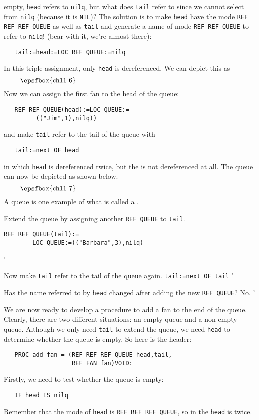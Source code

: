 empty, \verb|head| refers to \verb|nilq|, but what does \verb|tail|
refer to since we cannot select from \verb|nilq| (because it is
\verb|NIL|)? The solution is to make \verb|head| have the mode
\verb|REF REF REF QUEUE| as well as \verb|tail| and generate a name
of mode \verb|REF REF QUEUE| to refer to \verb|nilq|! (bear with it,
we're almost there):
\begin{verbatim}
   tail:=head:=LOC REF QUEUE:=nilq
\end{verbatim}
\noindent
In this triple assignment, only \verb|head| is dereferenced. We can
depict this as
$$\vbox{\epsfbox{ch11-6}}$$
Now we can assign the first fan to the head of the queue:
\begin{verbatim}
   REF REF QUEUE(head):=LOC QUEUE:=
         (("Jim",1),nilq))
\end{verbatim}
\noindent
and make \verb|tail| refer to the tail of the queue with
\begin{verbatim}
   tail:=next OF head
\end{verbatim}
\noindent
in which \verb|head| is dereferenced twice, but the
 is not dereferenced at all. The queue can
now be depicted as shown below.
$$\vbox{\epsfbox{ch11-7}}$$
A queue is one example of what is called a
.

\begin{exercise}
\item Extend the queue by assigning another \verb|REF QUEUE| to
\verb|tail|. \ans \begin{verbatim}
REF REF QUEUE(tail):=
        LOC QUEUE:=(("Barbara",3),nilq)
\end{verbatim}
'
\item Now make \verb|tail| refer to the tail of the queue again.
\ans \verb|tail:=next OF tail|
'
\item Has the name referred to by \verb|head| changed after adding the
new \verb|REF QUEUE|? \ans No.
'
\end{exercise}

We are now ready to develop a procedure to add a fan to the end of the
queue. Clearly, there are two different situations: an empty queue and
a non-empty queue. Although we only need \verb|tail| to extend the
queue, we need \verb|head| to determine whether the queue is empty. So
here is the header:
\begin{verbatim}
   PROC add fan = (REF REF REF QUEUE head,tail,
                   REF FAN fan)VOID:
\end{verbatim}
\noindent
Firstly, we need to test whether the queue is empty:
\begin{verbatim}
   IF head IS nilq
\end{verbatim}
\noindent
Remember that the mode of \verb|head| is \verb|REF REF REF QUEUE|, so
in the  \verb|head| is
 twice.

